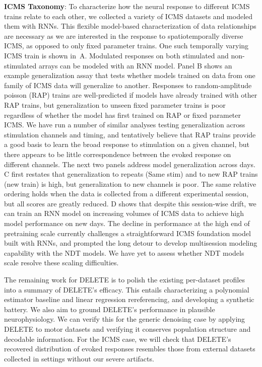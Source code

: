 \documentclass[12pt,oneside]{report}
\begin{document}
\textbf{ICMS Taxonomy}: To characterize how the neural response to different ICMS trains relate to each other, we collected a variety of ICMS datasets and modeled them with RNNs. This flexible model-based characterization of data relationships are necessary as we are interested in the response to spatiotemporally diverse ICMS, as opposed to only fixed parameter trains. One such temporally varying ICMS train is shown in~A. Modulated responses on both stimulated and non-stimulated arrays can be modeled with an RNN model. Panel B shows an example generalization assay that tests whether models trained on data from one family of ICMS data will generalize to another. Responses to random-amplitude poisson (RAP) trains are well-predicted if models have already trained with other RAP trains, but generalization to unseen fixed parameter trains is poor regardless of whether the model has first trained on RAP or fixed parameter ICMS.
We have run a number of similar analyses testing generalization across stimulation channels and timing, and tentatively believe that RAP trains provide a good basis to learn the broad response to stimulation on a given channel, but there appears to be little correspondence between the evoked response on different channels. The next two panels address model generalization across days. C first restates that generalization to repeats (Same stim) and to new RAP trains (new train) is high, but generalization to new channels is poor. The same relative ordering holds when the data is collected from a different experimental session, but all scores are greatly reduced. D shows that despite this session-wise drift, we can train an RNN model on increasing volumes of ICMS data to achieve high model performance on new days. The decline in performance at the high end of pretraining scale currently challenges a straightforward ICMS foundation model built with RNNs, and prompted the long detour to develop multisession modeling capability with the NDT models. We have yet to assess whether NDT models scale resolve these scaling difficulties.

The remaining work for DELETE is to polish the existing per-dataset profiles into a summary of DELETE’s efficacy. This entails characterizing a polynomial estimator baseline and linear regression rereferencing, and developing a synthetic battery. We also aim to ground DELETE’s performance in plausible neurophysiology. We can verify this for the generic denoising case by applying DELETE to motor datasets and verifying it conserves population structure and decodable information. For the ICMS case, we will check that DELETE’s recovered distribution of evoked responses resembles those from external datasets collected in settings without our severe artifacts.
\end{document}
